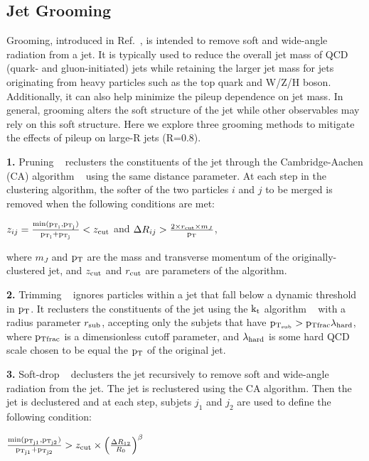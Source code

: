 \subsection{Jet Grooming }
Grooming, introduced in Ref.~\cite{Grooming}, is intended to remove soft and wide-angle radiation from a jet.  
It is typically used to reduce the overall jet mass of QCD (quark- and gluon-initiated) jets while retaining the larger jet mass for jets originating from heavy particles such as the top quark and W/Z/H boson. Additionally, it can also help minimize the pileup dependence on jet mass. In general, grooming alters the soft structure of the jet while other observables may rely on this soft structure. Here we explore three grooming methods to mitigate the effects of pileup on large-R jets (R=0.8).


{\bf 1. }Pruning ~\cite{Ellis:2009me} reclusters the constituents of the jet through the Cambridge-Aachen (CA) algorithm ~\cite{Dasgupta:2013ihk} using the same distance parameter.  
At each step in the clustering algorithm, the softer of the two particles $i$ and $j$ to be merged is removed when the following conditions are met:
 

$z_{ij} = \frac{{\rm min}(\rm p_{T_{i}}, p_{T_{j}})}{\rm p_{T_{i}} + p_{T_{j}}} < z_{\rm cut}$ and 
$\Delta R_{ij} >  \frac{2 \times r_{\rm cut} \times m_{J}}{\rm p_{T}} $,

where $m_{J}$ and $\rm p_{T}$ are the mass and transverse momentum of the originally-clustered jet, and $z_{\rm cut}$ and $r_{\rm cut}$ are parameters of the algorithm.

{\bf 2. }Trimming ~\cite{Krohn:2009th} ignores particles within a jet that fall below a dynamic threshold in $\rm p_{T}$. 
It reclusters the constituents of the jet using the $\rm k_{t}$ algorithm ~\cite{Cacciari:2008gp} with a radius parameter $r_{\rm sub}$, accepting only the subjets that have $\rm p_{T_{\rm sub}} > p_{Tfrac} \lambda_{\rm hard}$, where $\rm p_{Tfrac}$ is a dimensionless cutoff parameter, and $\lambda_{\rm hard}$ is some hard QCD scale chosen to be equal the $\rm p_{T}$ of the original jet. 

{\bf 3. }Soft-drop ~\cite{Larkoski:2014wba}  declusters the jet recursively to remove soft and wide-angle radiation from the jet.
The jet is reclustered using the CA algorithm.  Then the jet is declustered and at each step, subjets $j_{1}$ and $j_{2}$ are used to define the following condition:

$\frac{{\rm min}(\rm p_{T_{j1}},\rm p_{T_{j2}})}{\rm p_{T_{j1}}+p_{T_{j2}}} > z_{\rm cut} \times \left( \frac{\Delta R_{12}}{R_0} \right)^{\beta}$

